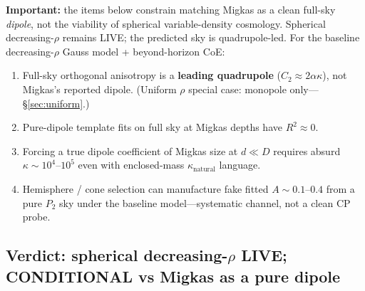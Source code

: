 \documentclass[11pt,a4paper]{article}
\begin{document}
\textbf{Important:} the items below constrain matching Migkas as a clean full-sky \emph{dipole}, not the viability of spherical variable-density cosmology. Spherical decreasing-\(\rho\) remains LIVE; the predicted sky is quadrupole-led. For the baseline decreasing-\(\rho\) Gauss model + beyond-horizon CoE:
\begin{enumerate}
\item Full-sky orthogonal anisotropy is a \textbf{leading quadrupole} (\(C_2\approx 2\alpha\kappa\)), not Migkas's reported dipole. (Uniform \(\rho\) special case: monopole only---\S\ref{sec:uniform}.)
\item Pure-dipole template fits on full sky at Migkas depths have \(R^2\approx 0\).
\item Forcing a true dipole coefficient of Migkas size at \(d\ll D\) requires absurd \(\kappa\sim 10^4\)--\(10^5\) even with enclosed-mass \(\kappa_{\mathrm{natural}}\) language.
\item Hemisphere / cone selection can manufacture fake fitted \(A\sim 0.1\)--\(0.4\) from a pure \(P_2\) sky under the baseline model---systematic channel, not a clean CP probe.
\end{enumerate}

\subsection{Verdict: spherical decreasing-\(\rho\) LIVE; CONDITIONAL vs Migkas as a pure dipole}
\end{document}
